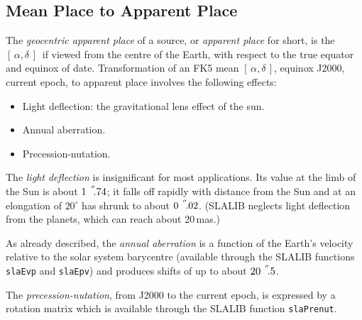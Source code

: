 \documentclass[11pt,fleqn,twoside]{article}
\renewcommand{\_}{{\tt\char'137}}     %
\newcommand{\radec}     {$[\,\alpha,\delta\,]$}
\newcommand{\arcseci}[1] {$#1\hspace{0.05em}$\raisebox{-0.5ex}
                         {$^{'\hspace{-0.1em}'\hspace{0.0em}}$}}
\newcommand{\arcsec}[2] {\arcseci{#1}$\hspace{-0.35em}.#2$}
\begin{document}
\subsection {Mean Place to Apparent Place}
The {\it geocentric apparent place}\/ of a source, or {\it apparent place}\/
for short,
is the \radec\ if viewed from the centre of the Earth,
with respect to the true equator and equinox of date.
Transformation of an FK5 mean \radec, equinox J2000,
current epoch, to apparent place involves the following effects:
\goodbreak
\begin{itemize}
   \item Light deflection: the gravitational lens effect of
         the sun.
   \item Annual aberration.
   \item Precession-nutation.
\end{itemize}
The {\it light deflection}\/ is insignificant for most
applications.  Its value
at the limb of the Sun is about
\arcsec{1}{74};  it falls off rapidly with distance from the
Sun and at an elongation of $20^\circ$ has shrunk to about
\arcsec{0}{02}. (SLALIB neglects light deflection from the planets,
which can reach about 20\,mas.)
 
As already described, the {\it annual aberration}\/
is a function of the Earth's velocity
relative to the solar system barycentre (available through the
SLALIB functions
{\tt slaEvp} and
{\tt slaEpv})
and produces shifts of up to about \arcsec{20}{5}.

The {\it precession-nutation}, from J2000 to the current epoch, is
expressed by a rotation matrix which is available through the
SLALIB function
{\tt slaPrenut}.
\end{document}
